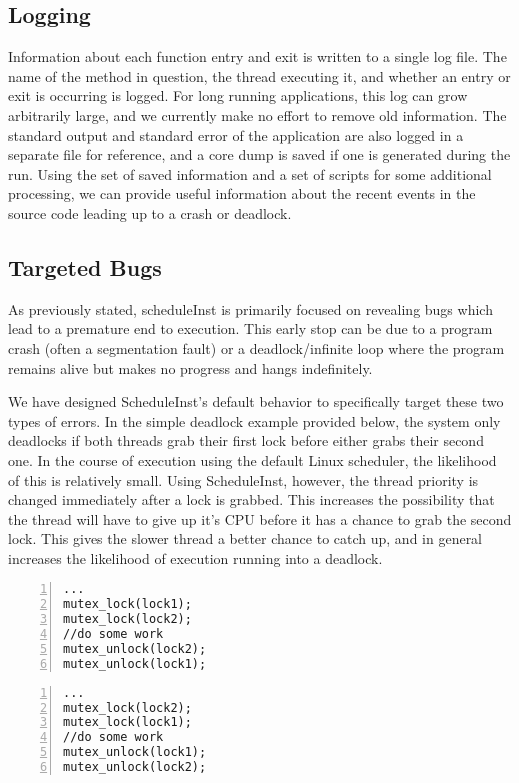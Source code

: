 \documentclass[10pt,]{article} %
\begin{document}
\subsection{Logging}

Information about each function entry and exit is written to a single log file.  The name of the method in question, the thread executing it, and whether an entry or exit is occurring is logged.  For long running applications, this log can grow arbitrarily large, and we currently make no effort to remove old information.  The standard output and standard error of the application are also logged in a separate file for reference, and a core dump is saved if one is generated during the run.  Using the set of saved information and a set of scripts for some additional processing, we can provide useful information about the recent events in the source code leading up to a crash or deadlock.



\subsection{Targeted Bugs}

As previously stated, scheduleInst is primarily focused on revealing bugs which lead to a premature end to execution.  This early stop can be due to a program crash (often a segmentation fault) or a deadlock/infinite loop where the program remains alive but makes no progress and hangs indefinitely.  

We have designed ScheduleInst’s default behavior to specifically target these two types of errors.  In the simple deadlock example provided below, the system only deadlocks if both threads grab their first lock before either grabs their second one.  In the course of execution using the default Linux scheduler, the likelihood of this is relatively small.  Using ScheduleInst, however, the thread priority is changed immediately after a lock is grabbed.  This increases the possibility that the thread will have to give up it’s CPU before it has a chance to grab the second lock.  This gives the slower thread a better chance to catch up, and in general increases the likelihood of execution running into a deadlock.  

\begin{minipage}[b]{0.45\linewidth}
\centering
\lstset{language=C,label=SliceExaple}
\begin{lstlisting}[frame=single, numbers=left, mathescape,%
  title={Deadlock Thread 1}, label=scopingExample]
...
mutex_lock(lock1);
mutex_lock(lock2);
//do some work
mutex_unlock(lock2);
mutex_unlock(lock1);
\end{lstlisting}
\end{minipage}
\hspace{0.5cm}
\begin{minipage}[b]{0.45\linewidth}
\centering
\begin{lstlisting}[frame=single,numbers=left, mathescape,%
  title={Deadlock Thread 2}, label=scopesEnteredContents]
...
mutex_lock(lock2);
mutex_lock(lock1);
//do some work
mutex_unlock(lock1);
mutex_unlock(lock2);
\end{lstlisting}
\end{minipage}
\end{document}
